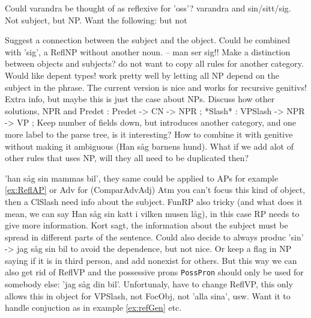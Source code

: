 \documentclass{report}
\begin{document}
Could varandra be thought of as reflexive for 'oss'?
varandra and sin/sitt/sig. Not subject, but NP.
Want the following:
but not
\label{ex:refGen}
\label{ex:ReflAP}

Suggest a connection between the subject and the object.
Could be combined with 'sig', a ReflNP without another noun.
-- man ser sig!!
Make a distinction between objects and subjects?
do not want to copy all rules for another category. Would like depent types!
work pretty well by letting all NP depend on the subject in the phrase.
The current version is nice and works for recursive genitivs!
Extra info, but maybe this is just the case about NPs.
Discuss how other solutions, NPR and Predet : Predet -> CN -> NPR ;
*Slash* : VPSlash -> NPR -> VP ;
Keep number of fields down, but introduces another category, and one more
label to the parse tree, is it interesting? How to combine it with genitive 
without making it ambiguous (Han såg barnens hund).
What if we add alot of other rules that uses NP, will they all need to be
duplicated then?

'han såg sin mammas bil', they same could be applied to
APs for example \ref{ex:ReflAP} or Adv for
 (ComparAdvAdj)
Atm you can't focus this kind of object, then a ClSlash need info about the
subject. FunRP also tricky (and what does it mean, we can say
Han såg sin katt i vilken musen låg), in this case RP needs to give more information.
Kort sagt, the information about the subject must be spread
in different parts of the sentence. 
Could also decide to always produc 'sin' -> jag såg sin bil
to avoid the dependence, but not nice. Or keep a flag in NP saying if it is
in third person, and add nonexist for others. But this way we can also get rid
of ReflVP and the possessive prons \verb|PossPron| should only be used for somebody else:
'jag såg din bil'.
Unfortunaly, have to change ReflVP, this only allows this in object for VPSlash, not FocObj,
not 'alla sina', usw. Want it to handle conjuction as in example \ref{ex:refGen}
etc.
\end{document}
